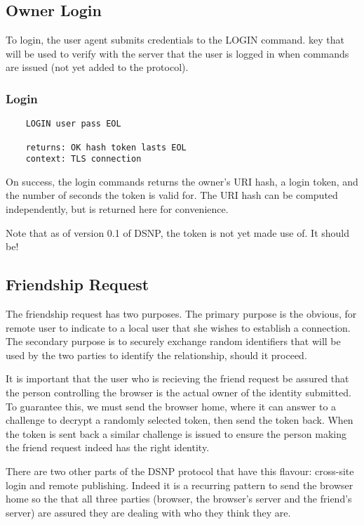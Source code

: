 \documentclass[letterpaper,11pt,oneside]{article}
\begin{document}
\subsection{Owner Login}

To login, the user agent submits credentials to the LOGIN command. key that
will be used to verify with the server that the user is logged in when commands
are issued (not yet added to the protocol).

\subsubsection{Login}

\vspace{10pt}
\begin{verbatim}
    LOGIN user pass EOL

    returns: OK hash token lasts EOL
    context: TLS connection
\end{verbatim}
\vspace{10pt}

On success, the login commands returns the owner's URI hash, a login token, and
the number of seconds the token is valid for. The URI hash can be computed
independently, but is returned here for convenience.

Note that as of version 0.1 of DSNP, the token is not yet made use of. It
should be!

\subsection{Friendship Request}

The friendship request has two purposes. The primary purpose is the obvious,
for remote user to indicate to a local user that she wishes to establish a
connection. The secondary purpose is to securely exchange random identifiers
that will be used by the two parties to identify the relationship, should it
proceed.

It is important that the user who is recieving the friend request be assured
that the person controlling the browser is the actual owner of the identity
submitted. To guarantee this, we must send the browser home, where it can
answer to a challenge to decrypt a randomly selected token, then send the token
back. When the token is sent back a similar challenge is issued to ensure the
person making the friend request indeed has the right identity.

There are two other parts of the DSNP protocol that have this flavour:
cross-site login and remote publishing. Indeed it is a recurring pattern to
send the browser home so the that all three parties (browser, the browser's
server and the friend's server) are assured they are dealing with who they
think they are.
\end{document}

